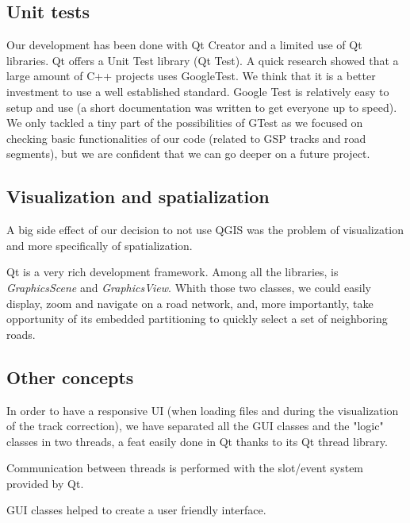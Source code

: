 \subsection{Unit tests}

Our development has been done with Qt Creator and a limited use of Qt libraries. Qt offers a Unit Test library (Qt Test). A quick research showed that a large amount of C++ projects uses GoogleTest. We think that it is a better investment to use a well established standard. 
Google Test is relatively easy to setup and use (a short documentation was written to get everyone up to speed). We only tackled a tiny part of the possibilities of GTest as we focused on checking basic functionalities of our code (related to GSP tracks and road segments), but we are confident that we can go deeper on a future project. 

\subsection{Visualization and spatialization}

A big side effect of our decision to not use QGIS was the problem of visualization and more specifically of spatialization.

Qt is a very rich development framework. Among all the libraries, is \textit{GraphicsScene} and \textit{GraphicsView}. Whith those two classes, we could easily display, zoom and navigate on a road network, and, more importantly, take opportunity of its embedded partitioning to quickly select a set of neighboring roads.

\subsection{Other concepts}

In order to have a responsive UI (when loading files and during the visualization of the track correction), we have separated all the GUI classes and the "logic" classes in two threads, a feat easily done in Qt thanks to its Qt thread library.

Communication between threads is performed with the slot/event system provided by Qt.

GUI classes helped to create a user friendly interface. 


